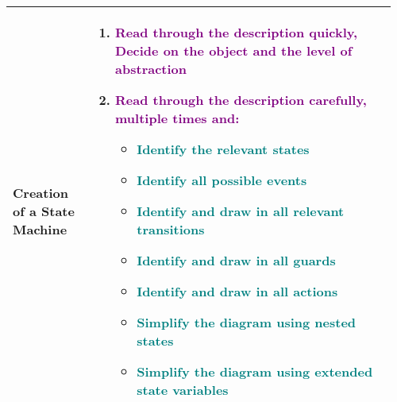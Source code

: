 \documentclass[main.tex,fontsize=8pt,paper=a4,paper=portrait,DIV=calc,]{scrartcl}
\begin{document}
\pagebreak
\begin{table}[ht!]
\begin{tabular}{|m{0.2\linewidth}|m{0.755\linewidth}|}
\hline
Creation of a State Machine & 
\vspace{2mm}
\begin{enumerate}
  \item \textcolor{purple}{Read through the description quickly,\newline
    Decide on the \textbf{object} and the \textbf{level of abstraction}}
  \item \textcolor{purple}{Read through the description \textbf{carefully, multiple times and:}}\newline
    \begin{itemize}
    \item \textcolor{teal}{Identify the relevant \textbf{states}}
    \item \textcolor{teal}{Identify all possible \textbf{events}}
    \item \textcolor{teal}{Identify and draw in \textbf{all relevant transitions}}
    \item \textcolor{teal}{Identify and draw in \textbf{all guards}}
    \item \textcolor{teal}{Identify and draw in \textbf{all actions}}
    \item \textcolor{teal}{Simplify the diagram using \textbf{nested states}}
    \item \textcolor{teal}{Simplify the diagram using \textbf{extended state variables}}
    \vspace{-3mm}
    \end{itemize}
\end{enumerate}\\
\hline
\end{tabular}

\end{table}
\end{document}
